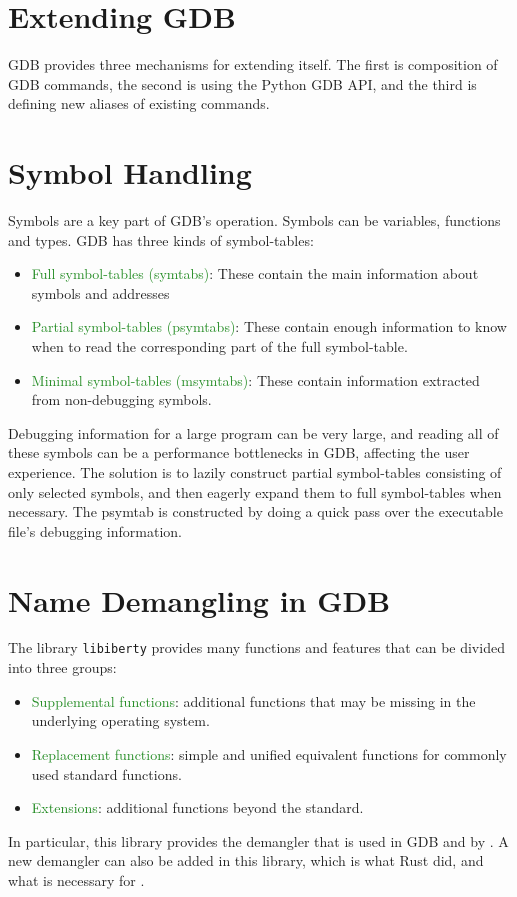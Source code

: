 \section{Extending GDB}
GDB provides three mechanisms for extending itself. The first is
composition of GDB commands, the second is using the Python GDB API, and the third is defining new aliases of existing commands.

\section{Symbol Handling}
Symbols are a key part of GDB's operation. Symbols can be variables, functions and
types. GDB has three kinds of symbol-tables:
\begin{itemize}
    \item \textcolor{ForestGreen}{Full symbol-tables (symtabs)}: These contain the main information
        about symbols and addresses
    \item \textcolor{ForestGreen} {Partial symbol-tables (psymtabs)}: These contain enough information to
        know when to read the corresponding part of the full symbol-table.
    \item \textcolor{ForestGreen}{Minimal symbol-tables (msymtabs)}: These
        contain information extracted from non-debugging symbols.
\end{itemize}

Debugging information for a large program can be very large, and reading all of
these symbols can be a performance bottlenecks in GDB, affecting the user
experience. The solution is to lazily construct partial symbol-tables consisting of
only selected symbols, and then eagerly expand them to full symbol-tables when
necessary.
The psymtab is constructed by doing a quick pass over the executable file's
debugging information.

\section{Name Demangling in GDB}
The library \verb|libiberty| provides many functions and features that can be
divided into three groups:
\begin{itemize}
    \item \textcolor{ForestGreen}{Supplemental functions}: additional functions
        that may be missing in
        the underlying operating system.
    \item \textcolor{ForestGreen}{Replacement functions}: simple and unified equivalent functions for
        commonly used standard functions.
    \item \textcolor{ForestGreen}{Extensions}: additional functions beyond the standard.
\end{itemize}

In particular, this library provides the \CCS demangler that is used in GDB and
by \uCPP. A new
demangler can also be added in this library, which is what Rust did, and what
is necessary for \CFA.
